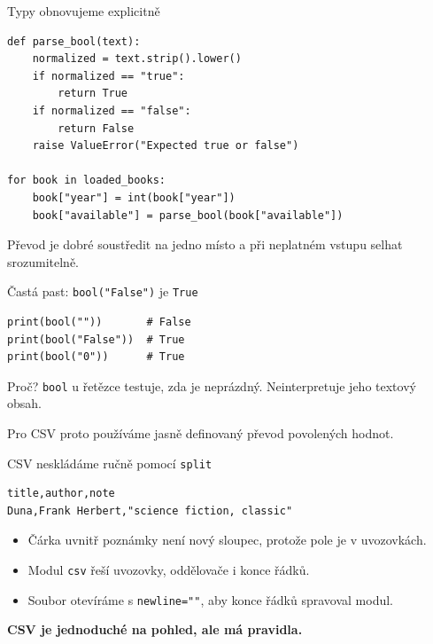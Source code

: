 \documentclass[aspectratio=169]{beamer}
\newcommand{\term}[1]{\textcolor{CodeBlue}{\textbf{#1}}}
\begin{document}
\begin{frame}[fragile]{Typy obnovujeme explicitně}
\begin{lstlisting}[style=pythonSmall,basicstyle=\ttfamily\small]
def parse_bool(text):
    normalized = text.strip().lower()
    if normalized == "true":
        return True
    if normalized == "false":
        return False
    raise ValueError("Expected true or false")

for book in loaded_books:
    book["year"] = int(book["year"])
    book["available"] = parse_bool(book["available"])
\end{lstlisting}
  Převod je dobré soustředit na jedno místo a při neplatném vstupu selhat srozumitelně.
\end{frame}

\begin{frame}[fragile]{Častá past: \texttt{bool("False")} je \texttt{True}}
\begin{lstlisting}[style=python]
print(bool(""))       # False
print(bool("False"))  # True
print(bool("0"))      # True
\end{lstlisting}
  \begin{block}{Proč?}
    \texttt{bool} u řetězce testuje, zda je neprázdný. Neinterpretuje jeho textový obsah.
  \end{block}
  Pro CSV proto používáme jasně definovaný převod povolených hodnot.
\end{frame}

\begin{frame}[fragile]{CSV neskládáme ručně pomocí \texttt{split}}
\begin{lstlisting}[style=data]
title,author,note
Duna,Frank Herbert,"science fiction, classic"
\end{lstlisting}
  \begin{itemize}
    \item Čárka uvnitř poznámky není nový sloupec, protože pole je v uvozovkách.
    \item Modul \texttt{csv} řeší uvozovky, oddělovače i konce řádků.
    \item Soubor otevíráme s \texttt{newline=""}, aby konce řádků spravoval modul.
  \end{itemize}
  \term{CSV je jednoduché na pohled, ale má pravidla.}
\end{frame}
\end{document}
